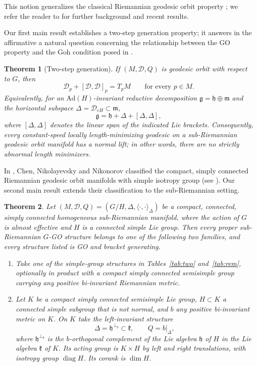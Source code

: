 \documentclass[12pt]{amsart}
\theoremstyle{plain}
\newtheorem{theorem}{Theorem}[section]
\theoremstyle{definition}
\theoremstyle{remark}
\newcommand{\diag}{\operatorname{diag}}
\begin{document}
This notion generalizes the classical Riemannian geodesic orbit property
\cite{Gordon96,KowalskiVanhecke}; we refer the reader to
\cite{Arvanitoyeorgos,BerestovskiiNikonorov} for further background and recent results.

Our first main result establishes a two-step generation property; it answers in the affirmative a
natural question concerning the relationship between the GO property and the Goh condition posed
in \cite[Remark 1.3]{YAD}.

\begin{theorem}[Two-step generation]\label{thm:twostep}
If $(M,\mathcal{D},Q)$ is geodesic orbit with respect to $G$, then
\[ \mathcal{D}_p+[\mathcal{D},\mathcal{D}]_p=T_pM\qquad\text{for every }p\in M. \]
Equivalently, for an $\mathrm{Ad}(H)$-invariant reductive decomposition
$\mathfrak{g}=\mathfrak{h}\oplus\mathfrak{m}$ and the horizontal subspace
$\Delta=\mathcal{D}_{eH}\subset\mathfrak{m}$,
\begin{equation}\label{eq:twostep}
\mathfrak{g}=\mathfrak{h}+\Delta+[\Delta,\Delta],
\end{equation}
where $[\Delta,\Delta]$ denotes the linear span of the indicated Lie brackets. Consequently, every
constant-speed locally length-minimizing geodesic on a sub-Riemannian geodesic orbit manifold has
a normal lift; in other words, there are no strictly abnormal length minimizers.
\end{theorem}

In \cite{ChenNN}, Chen, Nikolayevsky and Nikonorov classified the compact, simply connected
Riemannian geodesic orbit manifolds with simple isotropy group (see \cite[Thms.~1--2]{ChenNN}).
Our second main result extends their classification to the sub-Riemannian setting.

\begin{theorem}\label{thm:main}
Let $(M,\mathcal{D},Q)=(G/H,\Delta,\langle\cdot,\cdot\rangle_\Delta)$ be a compact, connected,
simply connected homogeneous sub-Riemannian manifold, where the action of $G$ is almost effective
and $H$ is a connected simple Lie group. Then every proper sub-Riemannian $G$-GO structure
belongs to one of the following two families, and every structure listed is GO and bracket
generating.
\begin{enumerate}\renewcommand{\labelenumi}{\upshape(\Alph{enumi})}
\item Take one of the simple-group structures in Tables~\ref{tab:two} and~\ref{tab:rem},
optionally in product with a compact simply connected semisimple group carrying any positive
bi-invariant Riemannian metric.
\item Let $K$ be a compact simply connected semisimple Lie group, $H\subset K$ a connected simple
subgroup that is not normal, and $b$ any positive bi-invariant metric on $K$. On $K$ take the
left-invariant structure
\[ \Delta=\mathfrak{h}^{\perp_b}\subset\mathfrak{k},\qquad Q=b|_{\Delta}, \]
where $\mathfrak{h}^{\perp_b}$ is the $b$-orthogonal complement of the Lie algebra $\mathfrak{h}$
of $H$ in the Lie algebra $\mathfrak{k}$ of $K$. Its acting group is $K\times H$ by left and right
translations, with isotropy group $\diag H$. Its corank is $\dim H$.
\end{enumerate}
\end{theorem}
\end{document}
